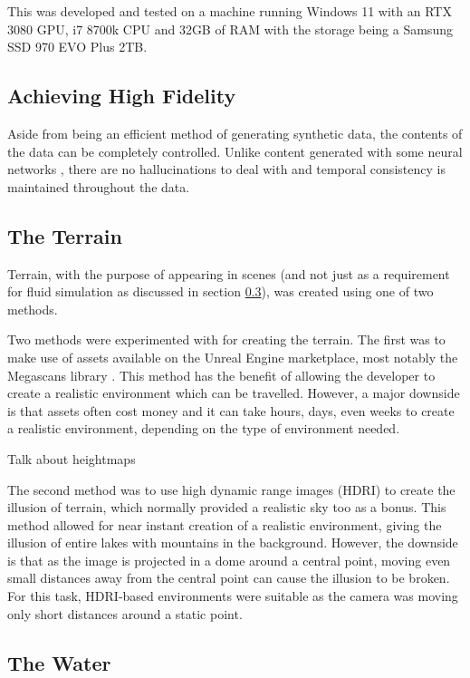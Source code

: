 \documentclass[10pt,twocolumn,letterpaper]{article}
\begin{document}
This was developed and tested on a machine running Windows 11 with an RTX 3080 GPU, i7 8700k CPU and 32GB of RAM with the storage being a Samsung SSD 970 EVO Plus 2TB.

\subsection{Achieving High Fidelity} \label {sec:achieving_high_fidelity}

Aside from being an efficient method of generating synthetic data, the contents of the data can be completely controlled. Unlike content generated with some neural networks \cite{richter2021enhancingphotorealismenhancement}, there are no hallucinations to deal with and temporal consistency is maintained throughout the data.

\subsection{The Terrain}

Terrain, with the purpose of appearing in scenes (and not just as a requirement for fluid simulation as discussed in section \ref{sec:the_water}), was created using one of two methods.

Two methods were experimented with for creating the terrain. The first was to make use of assets available on the Unreal Engine marketplace, most notably the Megascans library \cite{QuixelMegascans}. This method has the benefit of allowing the developer to create a realistic environment which can be travelled. However, a major downside is that assets often cost money and it can take hours, days, even weeks to create a realistic environment, depending on the type of environment needed.

Talk about heightmaps

The second method was to use high dynamic range images (HDRI) to create the illusion of terrain, which normally provided a realistic sky too as a bonus. This method allowed for near instant creation of a realistic environment, giving the illusion of entire lakes with mountains in the background. However, the downside is that as the image is projected in a dome around a central point, moving even small distances away from the central point can cause the illusion to be broken. For this task, HDRI-based environments were suitable as the camera was moving only short distances around a static point.

\subsection{The Water} \label {sec:the_water}
\end{document}
